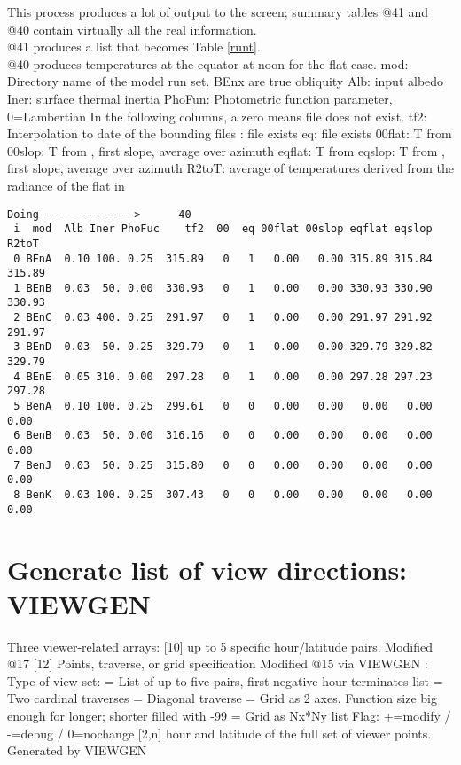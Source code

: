 \documentclass{article}
\begin{document}
This process produces a lot of output to the screen; summary tables @41 and @40 contain virtually all the real information.  
\\ @41 produces a list that becomes Table \ref{runt}. 
\\ @40 produces temperatures at the equator at noon for the flat case.
\qii mod: Directory name of the model run set. BEnx are true obliquity
\qii Alb: input albedo
\qii Iner: surface thermal inertia
\qii PhoFun: Photometric function parameter, 0=Lambertian
\qi In the following columns, a  zero means file does not exist.
\qii tf2: Interpolation to date of the bounding  files
:  file exists
\qii eq:   file exists
\qii 00flat:  T from  
\qii 00slop: T from  , first slope, average over azimuth
\qii eqflat:  T from  
\qii eqslop: T from  , first slope, average over azimuth
\qii R2toT: average of temperatures derived from the radiance of the flat in 

\vspace{-3.mm} 
\begin{verbatim}
Doing -------------->      40
 i  mod  Alb Iner PhoFuc    tf2  00  eq 00flat 00slop eqflat eqslop  R2toT
 0 BEnA  0.10 100. 0.25  315.89   0   1   0.00   0.00 315.89 315.84 315.89
 1 BEnB  0.03  50. 0.00  330.93   0   1   0.00   0.00 330.93 330.90 330.93
 2 BEnC  0.03 400. 0.25  291.97   0   1   0.00   0.00 291.97 291.92 291.97
 3 BEnD  0.03  50. 0.25  329.79   0   1   0.00   0.00 329.79 329.82 329.79
 4 BEnE  0.05 310. 0.00  297.28   0   1   0.00   0.00 297.28 297.23 297.28
 5 BenA  0.10 100. 0.25  299.61   0   0   0.00   0.00   0.00   0.00   0.00
 6 BenB  0.03  50. 0.00  316.16   0   0   0.00   0.00   0.00   0.00   0.00
 7 BenJ  0.03  50. 0.25  315.80   0   0   0.00   0.00   0.00   0.00   0.00
 8 BenK  0.03 100. 0.25  307.43   0   0   0.00   0.00   0.00   0.00   0.00
\end{verbatim}  

\section{Generate list of view directions: VIEWGEN }
 Three viewer-related arrays: 
\qi {} [10] up to 5 specific hour/latitude pairs. Modified @17
\qi {} [12] Points, traverse, or grid specification  Modified @15 via VIEWGEN
\qii [0]: Type of view set: 
= List of up to five pairs, first negative hour terminates list
= Two cardinal traverses
= Diagonal traverse
= Grid as 2 axes. Function size big enough for longer; shorter filled with -99
= Grid as Nx*Ny list
\qii [1]  Flag: +=modify / -=debug / 0=nochange
\qi{} [2,n] hour and latitude of the full set of viewer points. Generated by VIEWGEN
 
\end{document}
